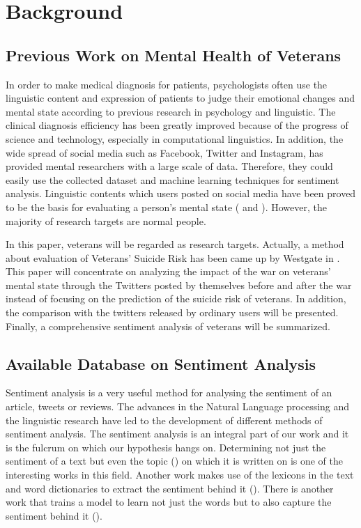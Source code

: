 \section{Background}

\subsection{Previous Work on Mental Health of Veterans}

In order to make medical diagnosis for patients, psychologists often use the
linguistic content and expression of patients to judge their emotional changes
and mental state according to previous research in psychology and linguistic.
The clinical diagnosis efficiency has been greatly improved because of the
progress of science and technology, especially in computational linguistics.
In addition, the wide spread of social media such as Facebook, Twitter and
Instagram, has provided mental researchers with a large scale of data.
Therefore, they could easily use the collected dataset and machine learning
techniques for sentiment analysis. Linguistic contents which users posted on
social media have been proved to be the basis for evaluating a person's mental
state (\cite{becauseIwastoldsomuch} and \cite{GUNTUKU201743}). However,
the majority of research targets are normal people.

In this paper, veterans will be regarded as research targets. Actually, a method
about evaluation of Veterans' Suicide Risk has been came up by Westgate in
\cite{doi:10.1176/appi.ps.201400283}. This paper will concentrate on analyzing
the impact of the war on veterans' mental state through the Twitters posted by
themselves before and after the war instead of focusing on the prediction of
the suicide risk of veterans. In addition, the comparison with the twitters
released by ordinary users will be presented. Finally, a comprehensive
sentiment analysis of veterans will be summarized.

\subsection{Available Database on Sentiment Analysis}

Sentiment analysis is a very useful method for analysing the sentiment of an
article, tweets or reviews. The advances in the Natural Language processing and
the linguistic research have led to the development of different methods of
sentiment analysis. The sentiment analysis is an integral part of our work and
it is the fulcrum on which our hypothesis hangs on. Determining not just the
sentiment of a text but even the topic (\cite{10.1145/1645953.1646003}) on which
it is written on is one of the interesting works in this field. Another work
makes use of the lexicons in the text and word dictionaries to extract the
sentiment behind it (\cite{10.5555/2002472.2002491}). There is another work that
trains a model to learn not just the words but to also capture the sentiment
behind it (\cite{taboada2011lexicon}).

